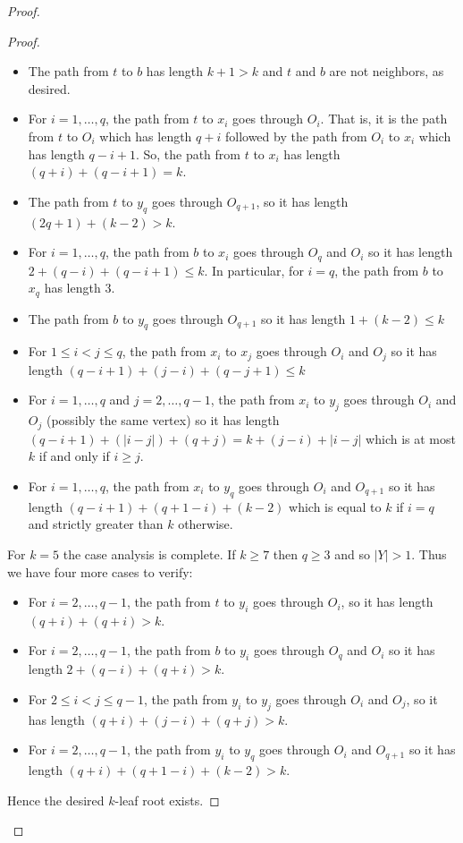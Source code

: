 \documentclass[11pt,letter]{article}
\theoremstyle{remark}
\begin{document}
\begin{proof}
\begin{proof}
        \begin{itemize}
            \item The path from $t$ to $b$ has length $k+1>k$ and $t$ and $b$ are not neighbors, as desired.
            \item For $i=1,\dots, q$, the path from $t$ to $x_i$ goes through $O_i$. That is, it is the path from $t$ to $O_i$ which has length $q+i$ followed by the path from $O_i$ to $x_i$ which has length $q-i+1$. So, the path from $t$ to $x_i$ has length $(q+i)+(q-i+1)=k$.
            \item The path from $t$ to $y_q$ goes through $O_{q+1}$, so it has length $(2q+1)+(k-2)>k$.
            \item For $i = 1, \ldots, q$, the path from $b$ to $x_i$ goes through $O_q$ and $O_i$ so it has length $2+(q-i)+(q-i+1)\leq k$. In particular, for $i=q$, the path from $b$ to $x_q$ has length $3$.
            \item The path from $b$ to $y_q$ goes through $O_{q+1}$ so it has length $1+(k-2)\leq k$
            \item For $1 \leq i < j \leq q$, the path from $x_i$ to $x_j$ goes through $O_i$ and $O_j$ so it has length $(q-i+1)+ (j - i) + (q-j+1)\leq k$
            \item 
            For $i = 1, \ldots, q$ and $j = 2, \ldots, q - 1$, the path from $x_i$ to $y_j$ goes through $O_i$ and $O_j$ (possibly the same vertex) so it has length $(q-i+1)+(|i-j|)+(q+j)=k+(j-i)+|i-j|$ which is at most $k$ if and only if $i\geq j$.
            \item For $i = 1, \ldots, q$, the path from $x_i$ to $y_q$ goes through $O_i$ and $O_{q+1}$ so it has length $(q-i+1)+(q+1-i)+(k-2)$ which is equal to $k$ if $i=q$ and strictly greater than $k$ otherwise.
         \end{itemize}
         For $k=5$ the case analysis is complete.
         If $k\geq 7$ then $q\geq 3$ and so $|Y|>1$. Thus we have four more cases to verify:
         \begin{itemize}
            \item For $i = 2, \ldots, q - 1$, the path from $t$ to $y_i$  goes through $O_i$, so it has length $(q+i)+(q+i)>k$.
            \item For $i = 2, \ldots, q - 1$, the path from $b$ to $y_i$ goes through $O_q$ and $O_i$ so it has length $2+(q-i)+(q+i)>k$.
            \item For $2 \leq i < j \leq q - 1$, the path from $y_i$ to $y_j$ goes through $O_i$ and $O_j$, so it has length $(q+i)+(j - i)+(q+j)>k$.
            \item For $i = 2, \ldots, q - 1$, the path from $y_i$ to $y_q$ goes through $O_i$ and $O_{q+1}$ so it has length $(q+i)+(q+1-i)+(k-2)>k$.
         \end{itemize}
         Hence the desired $k$-leaf root exists.
    \end{proof}


\end{proof}
\end{document}
